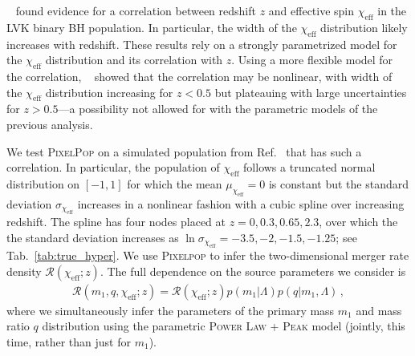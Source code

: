 \begin{refsection}
\citeauthor{Biscoveanu:2022qac}~\cite{Biscoveanu:2022qac} found evidence for a correlation between redshift $z$ and effective spin $\chi_\mathrm{eff}$ in the LVK binary BH population. In particular, the width of the $\chi_\mathrm{eff}$ distribution likely increases with redshift. These results rely on a strongly parametrized model for the $\chi_\mathrm{eff}$ distribution and its correlation with $z$. Using a more flexible model for the correlation, \citeauthor{Heinzel:2023hlb}~\cite{Heinzel:2023hlb} showed that the correlation may be nonlinear, with width of the $\chi_\mathrm{eff}$ distribution increasing for $z<0.5$ but plateauing with large uncertainties for $z>0.5$---a possibility not allowed for with the parametric models of the previous analysis.

We test \textsc{PixelPop} on a simulated population from Ref.~\cite{Heinzel:2023hlb} that has such a correlation. In particular, the population of $\chi_\mathrm{eff}$ follows a truncated normal distribution on $[-1,1]$ for which the mean $\mu_{\chi_\mathrm{eff}}=0$ is constant but the standard deviation $\sigma_{\chi_\mathrm{eff}}$ increases in a nonlinear fashion with a cubic spline over increasing redshift. The spline has four nodes placed at $z=0,0.3,0.65,2.3$, over which the the standard deviation increases as $\ln\sigma_{\chi_\mathrm{eff}}=-3.5,-2,-1.5,-1.25$; see Tab.~\ref{tab:true_hyper}. We use \textsc{Pixelpop} to infer the two-dimensional merger rate density $\mathcal{R}(\chi_\mathrm{eff};z)$. The full dependence on the source parameters we consider is
\begin{align}
\mathcal{R} ( m_1 , q , \chi_\mathrm{eff} ; z )
=
\mathcal{R} ( \chi_\mathrm{eff} ; z )
p ( m_1 | \Lambda )
p ( q | m_1, \Lambda )
\, ,
\label{eq: model z chieff}
\end{align}
where we simultaneously infer the parameters of the primary mass $m_1$ and mass ratio $q$ distribution using the parametric \textsc{Power Law + Peak} model (jointly, this time, rather than just for $m_1$).




\end{refsection}
